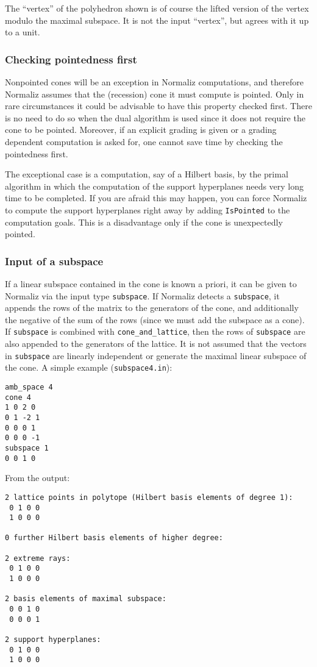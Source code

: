 The ``vertex'' of the polyhedron shown is of course the lifted version of the vertex modulo the maximal subspace. It is not the input ``vertex'', but agrees with it up to a unit.

\subsubsection{Checking pointedness first}\label{IsPointed}

Nonpointed cones will be an exception in Normaliz computations, and therefore Normaliz assumes that the (recession) cone it must compute is pointed. Only in rare circumstances it could be advisable to have this property checked first. There is no need to do so when the dual algorithm is used since it does not require the cone to be pointed. Moreover, if an explicit grading is given or a grading dependent computation is asked for, one cannot save time by checking the pointedness first.

The exceptional case is a computation, say of a Hilbert basis, by the primal algorithm in which the computation of the support hyperplanes needs very long time to be completed. If you are afraid this may happen, you can force Normaliz to compute the support hyperplanes right away by adding \verb|IsPointed| to the computation goals. This is a disadvantage only if the cone is unexpectedly pointed.

\subsubsection{Input of a subspace}\label{subspace}

If a linear subspace contained in the cone is known a priori, it can be given to Normaliz via the input type \verb|subspace|. If Normaliz detects a \verb|subspace|, it appends the rows of the matrix to the generators of the cone, and additionally the negative of the sum of the rows (since we must add the subspace as a cone). If \verb|subspace| is combined with \verb|cone_and_lattice|, then the rows of \verb|subspace| are also appended to the generators of the lattice. It is not assumed that the vectors in \verb|subspace| are linearly independent or generate the maximal linear subspace of the cone. A simple example (\verb|subspace4.in|):
\begin{Verbatim}
amb_space 4
cone 4
1 0 2 0
0 1 -2 1
0 0 0 1
0 0 0 -1
subspace 1
0 0 1 0
\end{Verbatim}

From the output:
\begin{Verbatim}
2 lattice points in polytope (Hilbert basis elements of degree 1):
 0 1 0 0
 1 0 0 0

0 further Hilbert basis elements of higher degree:

2 extreme rays:
 0 1 0 0
 1 0 0 0

2 basis elements of maximal subspace:
 0 0 1 0
 0 0 0 1

2 support hyperplanes:
 0 1 0 0
 1 0 0 0
\end{Verbatim}

